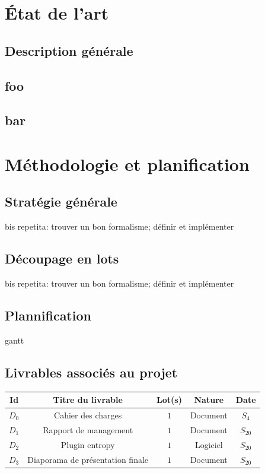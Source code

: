 \documentclass[a4paper]{article}
\begin{document}
\section{État de l'art}
\subsection{Description générale}
\subsection{foo}
\subsection{bar}

\section{Méthodologie et planification}
\subsection{Stratégie générale}
bis repetita: trouver un bon formalisme; définir et implémenter
\subsection{Découpage en lots}
bis repetita: trouver un bon formalisme; définir et implémenter
\subsection{Plannification}
gantt
\subsection{Livrables associés au projet}
\begin{table}
\centering
\begin{tabular}{c|c|c|c|c}
	Id & Titre du livrable & Lot(s) & Nature & Date \\
	\hline
	\hline
	$D_0$ & Cahier des charges & $1$ & Document & $S_4$ \\
	\hline
	$D_1$ & Rapport de management & $1$ & Document & $S_{20}$ \\
	\hline
	$D_2$ & Plugin entropy & $1$ & Logiciel & $S_{20}$ \\
	\hline
	$D_3$ & Diaporama de présentation finale & $1$ & Document & $S_{20}$ \\
\end{tabular}
\end{table}
\end{document}
